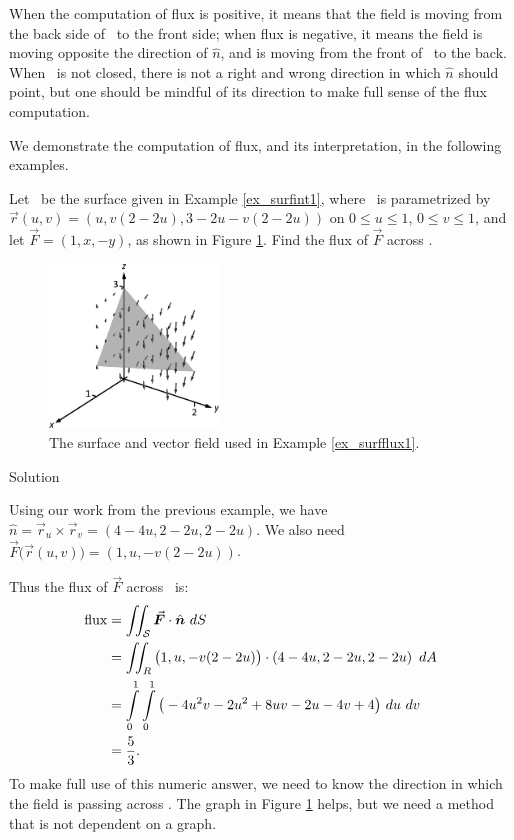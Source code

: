 When the computation of flux is positive, it means that the field is moving from the back side of \surfaceS\ to the front side; when flux is negative, it means the field is moving opposite the direction of $\hat n$, and is moving from the front of \surfaceS\ to the back. When \surfaceS\ is not closed, there is not a right and wrong direction in which $\hat n$ should point, but one should be mindful of its direction to make full sense of the flux computation.

We demonstrate the computation of flux, and its interpretation, in the following examples.


\begin{example}
\label{ex_surfflux1}
Let \surfaceS\ be the surface given in Example \ref{ex_surfint1}, where \surfaceS\ is parametrized by \\ $\vec r(u,v) = \left( u, v(2-2u),3-2u-v(2-2u)\right)$ on $0\leq u\leq 1$, $0\leq v\leq 1$, and let $\vec F = \left( 1, x,-y\right)$, as shown in Figure \ref{fig_Vector_Calc_27}. Find the flux of $\vec F$ across \surfaceS.


\begin{figure}[H]
	\begin{center}
			\includegraphics[width=0.4\textwidth]{fig_Vector_Calc_27}
	\caption{The surface and vector field used in  Example \ref{ex_surfflux1}.}
	\label{fig_Vector_Calc_27}
	\end{center}
\end{figure}

Solution 

Using our work from the previous example, we have $\hat n = \vec r_u\times\vec r_v = \left( 4-4u,2-2u,2-2u\right)$. We also need $\vec F\big(\vec r(u,v)\big) = \left( 1, u, -v(2-2u)\right)$. 

Thus the flux of $\vec F$ across \surfaceS\ is:
\begin{align*}
\text{flux} &= \iint_\surfaceS \vec F\cdot \hat n\ dS\\
			&= \iint_R \left( 1,u,-v(2-2u)\right)\cdot\left( 4-4u,2-2u,2-2u\right)\ dA \\
			&= \int\limits_0^1\int\limits_0^1 \big(-4u^2v-2u^2+8uv-2u-4v+4\big)\ du\ dv\\
			&= \dfrac{5}{3}.
\end{align*}
To make full use of this numeric answer, we need to know the direction in which the field is passing across \surfaceS. The graph in Figure \ref{fig_Vector_Calc_27} helps, but we need a method that is not dependent on a graph.


\end{example}
